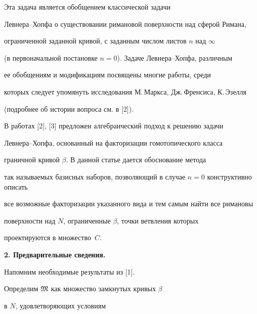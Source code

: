 Эта задача является обобщением классической задачи


Левнера--Хопфа о существовании римановой поверхности над сферой Римана,


ограниченной заданной кривой, с заданным числом листов $n$ над $\infty$


(в первоначальной постановке $n=0$). Задаче Левнера--Хопфа, различным


ее обобщениям и модификациям посвящены многие работы, среди


которых следует упомянуть исследования М.\,Маркса, Дж.\,Френсиса, К.\,Эзелля 


(подробнее об истории вопроса см. в [2]).





В работах [2], [3] предложен алгебраический подход к решению задачи


Левнера--Хопфа, основанный на факторизации гомотопического класса


граничной кривой $\beta$. В данной статье дается обоснование метода


так называемых базисных наборов, позволяющий в случае $n=0$ конструктивно описать


все возможные факторизации указанного вида и тем самым найти все римановы


поверхности над $N$, ограниченные $\beta$, точки ветвления которых


проектируются в множество~$C$.


\medskip





{\bf 2. Предварительные сведения.}


Напомним необходимые результаты из [1].


Определим $\frak M$ как множество замкнутых кривых $\beta$


в $N$, удовлетворяющих условиям


